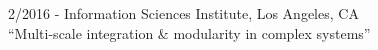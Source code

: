 \documentclass[margin,line,centered]{res}
\begin{document}
\begin{resume}
2/2016 - Information Sciences Institute, Los Angeles, CA\\
``Multi-scale integration \& modularity in complex systems'' %














\end{resume}
\end{document}
